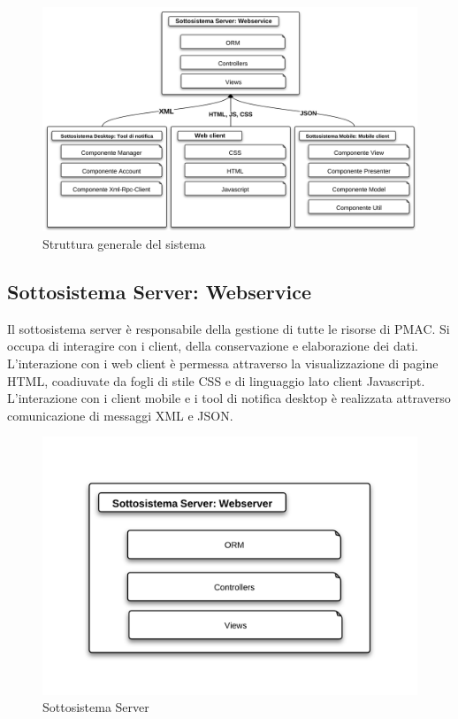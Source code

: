 \begin{figure}[H]
\centering
\includegraphics[scale=0.6]{images/sistema.png} %
\caption{Struttura generale del sistema}
\label{StrutturaGeneraleSistema}
\end{figure}



\subsection{Sottosistema Server: Webservice}
Il sottosistema server è responsabile della gestione di tutte le risorse di PMAC. Si occupa di interagire con i client, della conservazione e elaborazione dei dati. L'interazione con i web client è permessa attraverso la visualizzazione di pagine HTML, coadiuvate da fogli di stile CSS e di linguaggio lato client Javascript. L'interazione con i client mobile e i tool di notifica desktop è realizzata attraverso comunicazione di messaggi XML e JSON.

\begin{figure}[H]
\centering
\includegraphics[scale=0.7]{images/Server/sottosistemaServer.png} %
\caption{Sottosistema Server}
\end{figure}

